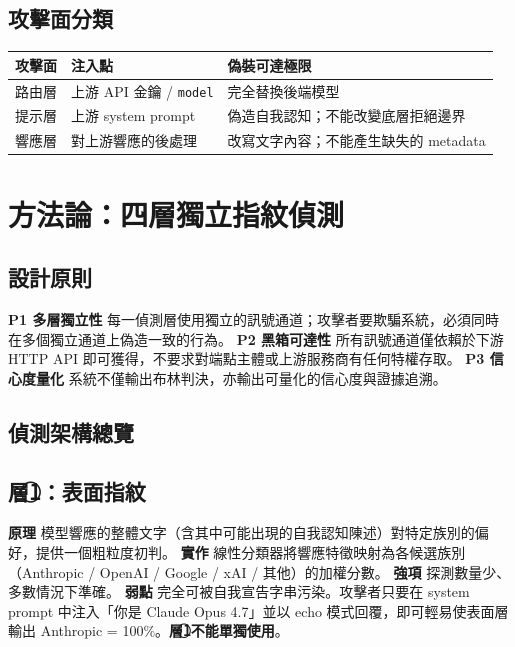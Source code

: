 \documentclass[UTF8,fontset=none,10pt,a4paper,twocolumn]{ctexart}
\begin{document}
\subsection{攻擊面分類}
\begin{table}[h]
\centering
\small
\begin{tabular}{@{}lll@{}}
\toprule
攻擊面 & 注入點 & 偽裝可達極限 \\
\midrule
路由層 & 上游 API 金鑰 / \texttt{model} & 完全替換後端模型 \\
提示層 & 上游 system prompt & 偽造自我認知；不能改變底層拒絕邊界 \\
響應層 & 對上游響應的後處理 & 改寫文字內容；不能產生缺失的 metadata \\
\bottomrule
\end{tabular}
\end{table}

\section{方法論：四層獨立指紋偵測}\label{sec:method}

\subsection{設計原則}
\textbf{P1 多層獨立性} 每一偵測層使用獨立的訊號通道；攻擊者要欺騙系統，必須同時在多個獨立通道上偽造一致的行為。
\textbf{P2 黑箱可達性} 所有訊號通道僅依賴於下游 HTTP API 即可獲得，不要求對端點主體或上游服務商有任何特權存取。
\textbf{P3 信心度量化} 系統不僅輸出布林判決，亦輸出可量化的信心度與證據追溯。

\subsection{偵測架構總覽}\label{sec:arch}


\subsection{層\texorpdfstring{\textcircled{\scriptsize 1}}{1}：表面指紋}\label{sec:layer1}
\textbf{原理} 模型響應的整體文字（含其中可能出現的自我認知陳述）對特定族別的偏好，提供一個粗粒度初判。
\textbf{實作} 線性分類器將響應特徵映射為各候選族別（Anthropic / OpenAI / Google / xAI / 其他）的加權分數。
\textbf{強項} 探測數量少、多數情況下準確。
\textbf{弱點} 完全可被自我宣告字串污染。攻擊者只要在 system prompt 中注入「你是 Claude Opus 4.7」並以 echo 模式回覆，即可輕易使表面層輸出 Anthropic = 100\%。\textbf{層\textcircled{\scriptsize 1}不能單獨使用}。
\end{document}
